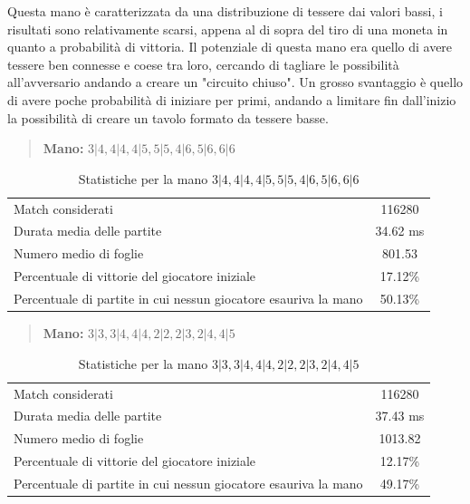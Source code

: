 \documentclass[a4paper,12pt]{report}
\begin{document}
Questa mano è caratterizzata da una distribuzione di tessere dai valori bassi, i risultati sono relativamente scarsi, appena al di sopra del tiro di una moneta in quanto a probabilità di vittoria.
Il potenziale di questa mano era quello di avere tessere ben connesse e coese tra loro, cercando di tagliare le possibilità all'avversario andando a creare un "circuito chiuso".
Un grosso svantaggio è quello di avere poche probabilità di iniziare per primi, andando a limitare fin dall'inizio la possibilità di creare un tavolo formato da tessere basse.


\begin{quote}
    \textbf{Mano:} \(3|4, 4|4, 4|5, 5|5, 4|6, 5|6, 6|6\)
\end{quote}

\begin{table}[h!]
    \centering
    \begin{tabular}{|l|c|}
        \hline
        Match considerati & 116280 \\
        Durata media delle partite & 34.62 ms \\
        Numero medio di foglie & 801.53 \\
        Percentuale di vittorie del giocatore iniziale & 17.12\% \\
        Percentuale di partite in cui nessun giocatore esauriva la mano & 50.13\% \\
        \hline
    \end{tabular}
    \caption{Statistiche per la mano \(3|4, 4|4, 4|5, 5|5, 4|6, 5|6, 6|6\)}
    \label{tab:stats_3}
\end{table}


\begin{quote}
    \textbf{Mano:} \(3|3, 3|4, 4|4, 2|2, 2|3, 2|4, 4|5\)
\end{quote}

\begin{table}[h!]
    \centering
    \begin{tabular}{|l|c|}
        \hline
        Match considerati & 116280 \\
        Durata media delle partite & 37.43 ms \\
        Numero medio di foglie & 1013.82 \\
        Percentuale di vittorie del giocatore iniziale & 12.17\% \\
        Percentuale di partite in cui nessun giocatore esauriva la mano & 49.17\% \\
        \hline
    \end{tabular}
    \caption{Statistiche per la mano \(3|3, 3|4, 4|4, 2|2, 2|3, 2|4, 4|5\)}
    \label{tab:stats_4}
\end{table}
\end{document}
